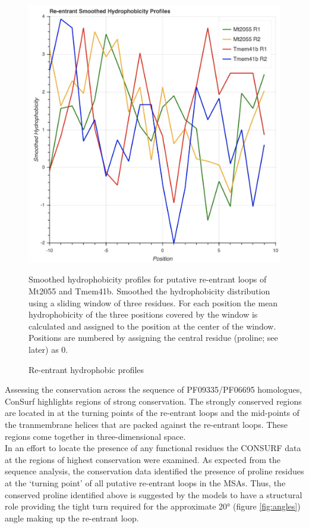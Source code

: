 \begin{figure}[th!]
    \centering
    \includegraphics[width=125mm, scale =0.5]{Results/hydro_profiles.png}
    \caption{Re-entrant hydrophobic profiles}
    \label{fig:hydro_profiles}
    \small
    Smoothed hydrophobicity profiles for putative re-entrant loops of Mt2055 and Tmem41b. Smoothed the hydrophobicity distribution using a sliding window of three residues. For each position the mean hydrophobicity \cite{Kyte1982} of the three positions covered by the window is calculated and assigned to the position at the center of the window. Positions are numbered by assigning the central residue (proline; see later) as 0.
\end{figure}

Assessing the conservation across the sequence of PF09335/PF06695 homologues, ConSurf highlights regions of strong conservation. The strongly conserved regions are located in at the turning points of the re-entrant loops  and the mid-points of the tranmembrane helices that are packed against the re-entrant loops.  These regions come together in three-dimensional space. \\

In an effort to locate the presence of any functional residues the CONSURF data at the regions of highest conservation were examined. As expected from the sequence analysis, the conservation data identified the presence of proline residues at the ‘turning point’ of all putative re-entrant loops in the MSAs. Thus, the conserved proline identified above is suggested by the models to have a structural role providing the tight turn required for the approximate 20° (figure \ref{fig:angles}) angle making up the re-entrant loop.  


